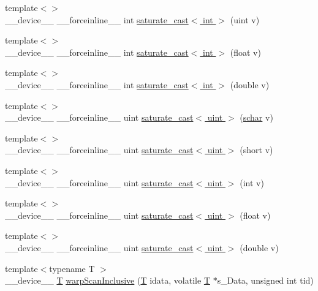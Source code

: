 \begin{DoxyCompactItemize}
\item 
{\footnotesize template$<$$>$ }\\\-\_\-\-\_\-device\-\_\-\-\_\- \-\_\-\-\_\-forceinline\-\_\-\-\_\- int \hyperlink{namespacecv_1_1gpu_1_1device_a4fe33c90d4a892db0a9806bb7266b433}{saturate\-\_\-cast$<$ int $>$} (uint v)
\item 
{\footnotesize template$<$$>$ }\\\-\_\-\-\_\-device\-\_\-\-\_\- \-\_\-\-\_\-forceinline\-\_\-\-\_\- int \hyperlink{namespacecv_1_1gpu_1_1device_af7e72f7ef736eb40dd878bf15d601298}{saturate\-\_\-cast$<$ int $>$} (float v)
\item 
{\footnotesize template$<$$>$ }\\\-\_\-\-\_\-device\-\_\-\-\_\- \-\_\-\-\_\-forceinline\-\_\-\-\_\- int \hyperlink{namespacecv_1_1gpu_1_1device_abc01c33b640b93a140f48317eb6a78ce}{saturate\-\_\-cast$<$ int $>$} (double v)
\item 
{\footnotesize template$<$$>$ }\\\-\_\-\-\_\-device\-\_\-\-\_\- \-\_\-\-\_\-forceinline\-\_\-\-\_\- uint \hyperlink{namespacecv_1_1gpu_1_1device_ae658420d7803689d926beaf9701c959f}{saturate\-\_\-cast$<$ uint $>$} (\hyperlink{core_2types__c_8h_a0fd9ce9d735064461bebfe6037026093}{schar} v)
\item 
{\footnotesize template$<$$>$ }\\\-\_\-\-\_\-device\-\_\-\-\_\- \-\_\-\-\_\-forceinline\-\_\-\-\_\- uint \hyperlink{namespacecv_1_1gpu_1_1device_afca3fbbf7666364c276b596f92584286}{saturate\-\_\-cast$<$ uint $>$} (short v)
\item 
{\footnotesize template$<$$>$ }\\\-\_\-\-\_\-device\-\_\-\-\_\- \-\_\-\-\_\-forceinline\-\_\-\-\_\- uint \hyperlink{namespacecv_1_1gpu_1_1device_aa9752851ea1351704ba3f8d8aad4a907}{saturate\-\_\-cast$<$ uint $>$} (int v)
\item 
{\footnotesize template$<$$>$ }\\\-\_\-\-\_\-device\-\_\-\-\_\- \-\_\-\-\_\-forceinline\-\_\-\-\_\- uint \hyperlink{namespacecv_1_1gpu_1_1device_a75ed05b67e6fc4f232b16f45f20d6249}{saturate\-\_\-cast$<$ uint $>$} (float v)
\item 
{\footnotesize template$<$$>$ }\\\-\_\-\-\_\-device\-\_\-\-\_\- \-\_\-\-\_\-forceinline\-\_\-\-\_\- uint \hyperlink{namespacecv_1_1gpu_1_1device_a293def956ce42c0f5bc9d54857eeed2d}{saturate\-\_\-cast$<$ uint $>$} (double v)
\item 
{\footnotesize template$<$typename T $>$ }\\\-\_\-\-\_\-device\-\_\-\-\_\- \hyperlink{calib3d_8hpp_a3efb9551a871ddd0463079a808916717}{T} \hyperlink{namespacecv_1_1gpu_1_1device_a87edb73f5d347fb4deb04296ec7cff8d}{warp\-Scan\-Inclusive} (\hyperlink{calib3d_8hpp_a3efb9551a871ddd0463079a808916717}{T} idata, volatile \hyperlink{calib3d_8hpp_a3efb9551a871ddd0463079a808916717}{T} $\ast$s\-\_\-\-Data, unsigned int tid)

\end{DoxyCompactItemize}
